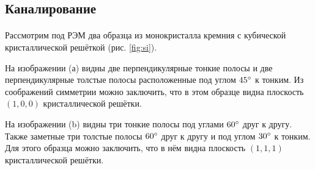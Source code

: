 \documentclass[a4paper,12pt]{article} %
\begin{document}
\subsection{Каналирование}

\paragraph{} Рассмотрим под РЭМ два образца из монокристалла кремния с кубической кристаллической решёткой (рис. \ref{fig:si}). 

На изображении (а) видны две перпендикулярные тонкие полосы и две перпендикулярные толстые полосы расположенные под углом $45\degree$ к тонким. Из соображений симметрии можно заключить, что в этом образце видна плоскость $(1,0,0)$ кристаллической решётки. 

На изображении (b) видны три тонкие полосы под углами $60\degree$ друг к другу. Также заметные три толстые полосы  $60\degree$ друг к другу и под углом $30\degree$ к тонким. Для этого образца можно заключить, что в нём видна плоскость $(1,1,1)$ кристаллической решётки.  
\end{document}
